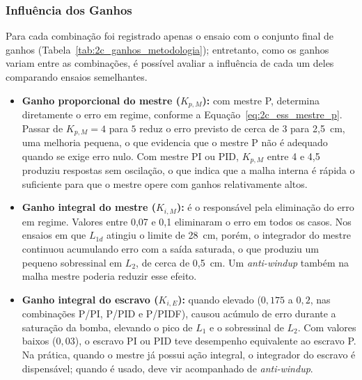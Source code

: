\documentclass[a4paper,12pt]{article}
\begin{document}
\subsubsection{Influência dos Ganhos}
\label{sec:2c_ganhos}

\begin{justify}
    \hspace{4ex}Para cada combinação foi registrado apenas o ensaio com o conjunto final de ganhos (Tabela~\ref{tab:2c_ganhos_metodologia}); entretanto, como os ganhos variam entre as combinações, é possível avaliar a influência de cada um deles comparando ensaios semelhantes.
\end{justify}

\begin{itemize}
    \item \textbf{Ganho proporcional do mestre ($K_{p,M}$):} com mestre P, determina diretamente o erro em regime, conforme a Equação~\eqref{eq:2c_ess_mestre_p}. Passar de $K_{p,M} = 4$ para $5$ reduz o erro previsto de cerca de 3 para 2,5~cm, uma melhoria pequena, o que evidencia que o mestre P não é adequado quando se exige erro nulo. Com mestre PI ou PID, $K_{p,M}$ entre 4 e 4,5 produziu respostas sem oscilação, o que indica que a malha interna é rápida o suficiente para que o mestre opere com ganhos relativamente altos.

    \item \textbf{Ganho integral do mestre ($K_{i,M}$):} é o responsável pela eliminação do erro em regime. Valores entre 0,07 e 0,1 eliminaram o erro em todos os casos. Nos ensaios em que $L_{1d}$ atingiu o limite de 28~cm, porém, o integrador do mestre continuou acumulando erro com a saída saturada, o que produziu um pequeno sobressinal em $L_2$, de cerca de 0,5~cm. Um \textit{anti-windup} também na malha mestre poderia reduzir esse efeito.

    \item \textbf{Ganho integral do escravo ($K_{i,E}$):} quando elevado ($0{,}175$ a $0{,}2$, nas combinações P/PI, P/PID e P/PIDF), causou acúmulo de erro durante a saturação da bomba, elevando o pico de $L_1$ e o sobressinal de $L_2$. Com valores baixos ($0{,}03$), o escravo PI ou PID teve desempenho equivalente ao escravo P. Na prática, quando o mestre já possui ação integral, o integrador do escravo é dispensável; quando é usado, deve vir acompanhado de \textit{anti-windup}.


\end{itemize}
\end{document}
